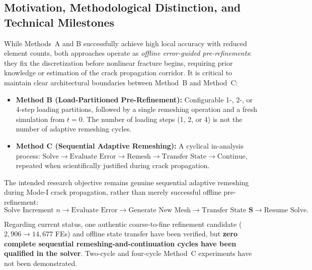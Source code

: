 \begin{enumerate}
\subsection{Motivation, Methodological Distinction, and Technical Milestones}
\label{subsec:method_c_motivation}

While Methods~A and B successfully achieve high local accuracy with reduced element counts, both approaches operate as \emph{offline error-guided pre-refinements}: they fix the discretization before nonlinear fracture begins, requiring prior knowledge or estimation of the crack propagation corridor. It is critical to maintain clear architectural boundaries between Method~B and Method~C:
\begin{itemize}
  \item \textbf{Method B (Load-Partitioned Pre-Refinement):} Configurable 1-, 2-, or 4-step loading partitions, followed by a single remeshing operation and a fresh simulation from $t = 0$. The number of loading steps (1, 2, or 4) is not the number of adaptive remeshing cycles.
  \item \textbf{Method C (Sequential Adaptive Remeshing):} A cyclical in-analysis process: $\text{Solve} \to \text{Evaluate Error} \to \text{Remesh} \to \text{Transfer State} \to \text{Continue}$, repeated when scientifically justified during crack propagation.
\end{itemize}

The intended research objective remains genuine sequential adaptive remeshing during Mode-I crack propagation, rather than merely successful offline pre-refinement:
\begin{equation}
  \text{Solve Increment } n \longrightarrow \text{Evaluate Error} \longrightarrow \text{Generate New Mesh} \longrightarrow \text{Transfer State } \mathbf{S} \longrightarrow \text{Resume Solve}.
  \label{eq:sequential_remeshing_cycle}
\end{equation}

Regarding current status, one authentic coarse-to-fine refinement candidate ($2{,}906 \to 14{,}677$ FEs) and offline state transfer have been verified, but \textbf{zero complete sequential remeshing-and-continuation cycles have been qualified in the solver}. Two-cycle and four-cycle Method~C experiments have not been demonstrated.


\end{enumerate}
